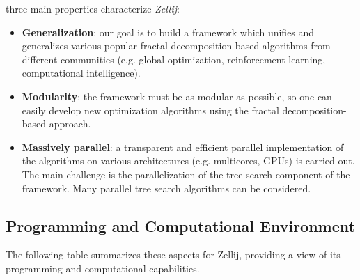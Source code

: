three main properties characterize \textit{Zellij}:
\begin{itemize}
\item \textbf{Generalization}: our goal is to build a framework which unifies and generalizes various popular fractal decomposition-based algorithms from different communities (e.g. global optimization, reinforcement learning, computational intelligence).
\item \textbf{Modularity}: the framework must be as modular as possible, so one can easily develop new optimization algorithms using the fractal decomposition-based approach. 
\item \textbf{Massively parallel}: a transparent and efficient parallel implementation of the algorithms on various architectures (e.g. multicores, GPUs) is carried out. The main challenge is the parallelization of the tree search component of the framework. Many parallel tree search algorithms can be considered.
\end{itemize}

\subsection{Programming and Computational Environment}
\label{sec::Zellij:environment_capabilities}

The following table summarizes these aspects for Zellij, providing a  view of its programming and computational capabilities.

